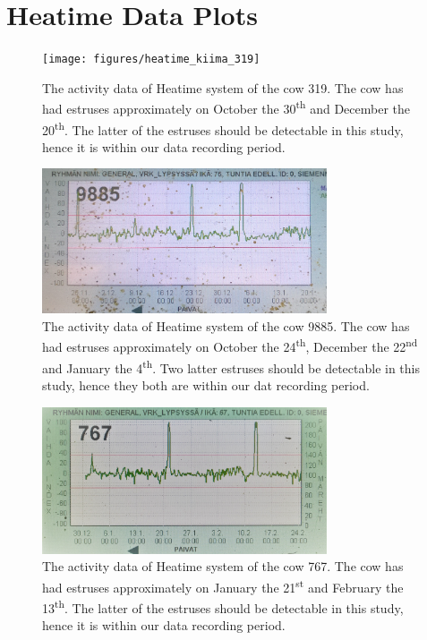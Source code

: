 \clearpage
\section{Heatime Data Plots}

\begin{figure}[htb]
\centering
\texttt{[image: figures/heatime\_kiima\_319]}
\caption{The activity data of Heatime system of the cow 319. The cow has had estruses approximately on October the 30\textsuperscript{th} and December the 20\textsuperscript{th}. The latter of the estruses should be detectable in this study, hence it is within our data recording period.}
\label{heatime_kiima_319}
\end{figure}


\begin{figure}[htb]
\centering
\includegraphics[width = 0.75\textwidth]{figures/heatime_kiima_9885}
\caption{The activity data of Heatime system of the cow 9885. The cow has had estruses approximately on October the 24\textsuperscript{th}, December the 22\textsuperscript{nd} and January the 4\textsuperscript{th}. Two latter estruses should be detectable in this study, hence they both are within our dat recording period. }
\label{heatime_kiima_9885}
\end{figure}

\begin{figure}[htb]
\centering
\includegraphics[width = 0.75\textwidth]{figures/heatime_kiima_767}
\caption{The activity data of Heatime system of the cow 767. The cow has had estruses approximately on January the 21\textsuperscript{st} and February the 13\textsuperscript{th}. The latter of the estruses should be detectable in this study, hence it is within our data recording period.}
\label{heatime_kiima_767_2}
\end{figure}

